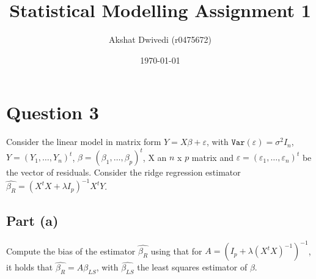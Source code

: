 \documentclass[paper=a4, fontsize=11pt]{scrartcl} %
\title{Statistical Modelling Assignment 1}
\author{Akshat Dwivedi (r0475672)}
\date{\today}
\numberwithin{equation}{section} %
\begin{document}
\maketitle

\section*{Question 3}

Consider the linear model in matrix form $Y = X\beta + \varepsilon$, with $\texttt{Var}(\varepsilon) = \sigma^2 I_n$, $Y = (Y_1, \ldots, Y_n)^t$, $\beta = (\beta_1, \ldots, \beta_p)^t$, X an $n$ x $p$ matrix and $\varepsilon = (\varepsilon_1, \ldots, \varepsilon_n)^t$ be the vector of residuals. Consider the ridge regression estimator $\hat{\beta_R} = (X^tX + \lambda I_p)^{-1} X^t Y$.

\subsection*{Part (a)}

Compute the bias of the estimator $\hat{\beta_R}$ using that for $A = (I_p + \lambda(X^t X)^{-1})^{-1}$, it holds that $\hat{\beta_R} = A \hat{\beta_{LS}}$, with $\hat{\beta_{LS}}$ the least squares estimator of $\beta$.
\end{document}
